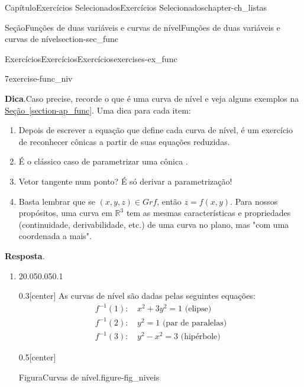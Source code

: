 \documentclass[oneside,10pt,]{book}
\newcommand{\blocktitlefont}{\relax}
\newcommand{\xreffont}{\relax}
\numberwithin{equation}{section}
\newcommand{\R}{\mathbb R}
\begin{document}
\begin{chapterptx}{Capítulo}{Exercícios Selecionados}{}{Exercícios Selecionados}{}{}{chapter-ch_listas}
\begin{sectionptx}{Seção}{Funções de duas variáveis e curvas de nível}{}{Funções de duas variáveis e curvas de nível}{}{}{section-sec_func}
\begin{exercises-subsection-numberless}{Exercícios}{Exercícios}{}{Exercícios}{}{}{exercises-ex_func}
\begin{divisionexercise}{7}{}{}{exercise-func_niv}
%
\par\smallskip%
\noindent\textbf{\blocktitlefont Dica}.\hypertarget{hint-func_niv-b}{}\quad{}Caso precise, recorde o que é uma curva de nível e veja alguns exemplos na \hyperref[section-ap_func]{Seção~{\xreffont\ref{section-ap_func}}}. Uma dica para cada item:%
\begin{enumerate}[label=\alph*.]
\item{}Depois de escrever a equação que define cada curva de nível, é um exercício de reconhecer cônicas a partir de suas equações reduzidas.%
\item{}É o clássico caso de parametrizar uma cônica%
. \item{}Vetor tangente num ponto? É só derivar a parametrização!%
\item{}Basta lembrar que se \((x,y,z)\in Gr f\), então \(z=f(x,y)\). Para nossos propósitos, uma curva em \(\R^3\) tem as mesmas características e propriedades (continuidade, derivabilidade, etc.) de uma curva no plano, mas "com uma coordenada a mais".%
\end{enumerate}
%
\par\smallskip%
\noindent\textbf{\blocktitlefont Resposta}.\hypertarget{answer-func_niv-c}{}\quad{}%
\begin{enumerate}[label=\alph*.]
\item{}\begin{sidebyside}{2}{0.05}{0.05}{0.1}%
\begin{sbspanel}{0.3}[center]%
As curvas de nível são dadas pelas seguintes equações:%
\begin{align*}
f^{-1}(1)\colon\,& x^2+3y^2=1 \text{ (elipse)}\\
f^{-1}(2)\colon\,& y^2=1 \text{ (par de paralelas)}\\
f^{-1}(3)\colon\,& y^2-x^2=3 \text{ (hipérbole)}
\end{align*}
%
\end{sbspanel}%
\begin{sbspanel}{0.5}[center]%
\begin{panelfigureptx}{Figura}{Curvas de nível.}{figure-fig_niveis}{}%
\end{panelfigureptx}
\end{sbspanel}
\end{sidebyside}
\end{enumerate}
\end{divisionexercise}
\end{exercises-subsection-numberless}
\end{sectionptx}
\end{chapterptx}
\end{document}
